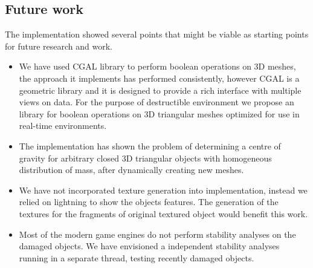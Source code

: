 \subsection*{Future work}
The implementation showed several points that might be viable as starting points for future research and work.
\begin{itemize}
\item We have used CGAL library to perform boolean operations on 3D meshes, the approach it implements has performed consistently, however CGAL is a geometric library and it is designed to provide a rich interface with multiple views on data. For the purpose of destructible environment we propose an library for boolean operations on 3D triangular meshes optimized for use in real-time environments.
\item The implementation has shown the problem of determining a centre of gravity for arbitrary closed 3D triangular objects with homogeneous distribution of mass, after dynamically creating new meshes.
\item We have not incorporated texture generation into implementation, instead we relied on lightning to show the objects features. The generation of the textures for the fragments of original textured object would benefit this work.
\item Most of the modern game engines do not perform stability analyses on the damaged objects. We have envisioned a independent stability analyses running in a separate thread, testing recently damaged objects.
\end{itemize}

